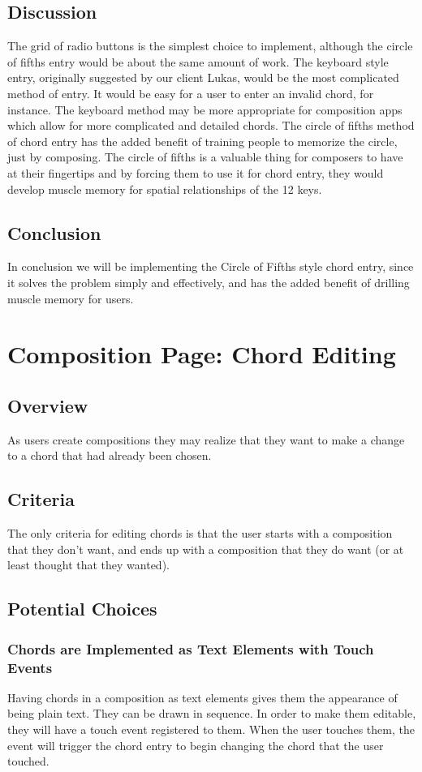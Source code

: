 \documentclass[onecolumn, draftclsnofoot,10pt, compsoc]{IEEEtran}
\begin{document}
\subsection{Discussion}
The grid of radio buttons is the simplest choice to implement, although the circle of fifths entry would be about the same amount of work. 
The keyboard style entry, originally suggested by our client Lukas, would be the most complicated method of entry. 
It would be easy for a user to enter an invalid chord, for instance. 
The keyboard method may be more appropriate for composition apps which allow for more complicated and detailed chords. 
The circle of fifths method of chord entry has the added benefit of training people to memorize the circle, just  by composing. 
The circle of fifths is a valuable thing for composers to have at their fingertips and by forcing them to use it for chord entry, they would develop muscle memory for spatial relationships of the 12 keys. 
\subsection{Conclusion}
In conclusion we will be implementing the Circle of Fifths style chord entry, since it solves the problem simply and effectively, and has the added benefit of drilling muscle memory for users.

\section{Composition Page: Chord Editing}
\subsection{Overview}
As users create compositions they may realize that they want to make a change to a chord that had already been chosen. 
\subsection{Criteria}
The only criteria for editing chords is that the user starts with a composition that they don't want, and ends up with a composition that they do want (or at least thought that they wanted). 
\subsection{Potential Choices}
\subsubsection{Chords are Implemented as Text Elements with Touch Events}
Having chords in a composition as text elements gives them the appearance of being plain text. They can be drawn in sequence. In order to make them editable, they will have a touch event registered to them. When the user touches them, the event will trigger the chord entry to begin changing the chord that the user touched. 
\end{document}
